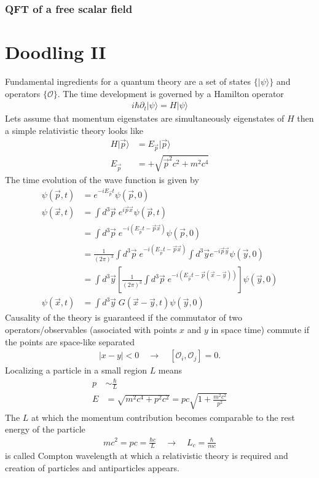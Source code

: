 \documentclass[10pt,a4paper]{book}
\theoremstyle{definition}
\begin{document}
\subsection{QFT of a free scalar field}


\newpage
\chapter{Doodling II}
Fundamental ingredients for a quantum theory are a set of states $\{|\psi\rangle\}$ and operators $\{\mathcal{O}\}$. The time development is governed by a Hamilton operator
\begin{align}
    i\hbar\partial_t|\psi\rangle=H|\psi\rangle
\end{align}
Lets assume that momentum eigenstates are simultaneously eigenstates of $H$ then a simple relativistic theory looks like
\begin{align}
    H|\vec{p}\rangle&= E_{\vec{p}}|\vec{p}\rangle\\
    E_{\vec{p}}&=+\sqrt{\vec{p}^2c^2+m^2c^4}
\end{align}
The time evolution of the wave function is given by
\begin{align}
    \psi(\vec{p},t) &= e^{-iE_{\vec{p}} t} \psi(\vec{p},0)\\
    \psi(\vec{x},t) &= \int d^3\vec{p}\;e^{i\vec{p}\vec{x}}\psi(\vec{p},t)\\
    &=\int d^3\vec{p}\;e^{-i(E_{\vec{p}} t-\vec{p}\vec{x})}\psi(\vec{p},0)\\
    &=\frac{1}{(2\pi)^3}\int d^3\vec{p}\;e^{-i(E_{\vec{p}} t-\vec{p}\vec{x})}\int d^3\vec{y}e^{-i\vec{p}\vec{y}}\psi(\vec{y},0)\\
    &=\int d^3\vec{y}\left[\frac{1}{(2\pi)^3}\int d^3\vec{p}\;e^{-i(E_{\vec{p}} t-\vec{p}(\vec{x}-\vec{y}))}\right]\psi(\vec{y},0)\\
    \psi(\vec{x},t) &= \int d^3\vec{y}\;G(\vec{x}-\vec{y},t) \psi(\vec{y},0)
\end{align}
Causality of the theory is guaranteed if the commutator of two operators/observables (associated with points $x$ and $y$ in space time) commute if the points are space-like separated
\begin{align}
    |x-y|<0\quad\rightarrow\quad [\mathcal{O}_i,\mathcal{O}_j]=0.
\end{align}
Localizing a particle in a small region $L$ means
\begin{align}
    p&\sim\frac{\hbar}{L}\\
    E&=\sqrt{m^2c^4+p^2c^2}= pc\sqrt{1+\frac{m^2c^2}{p^2}}
\end{align}
The $L$ at which the momentum contribution becomes comparable to the rest energy of the particle
\begin{align}
    mc^2=pc = \frac{\hbar c}{L}\quad\rightarrow\quad L_c=\frac{\hbar}{mc}
\end{align}
is called Compton wavelength at which a relativistic theory is required and creation of particles and antiparticles appears.
\end{document}
